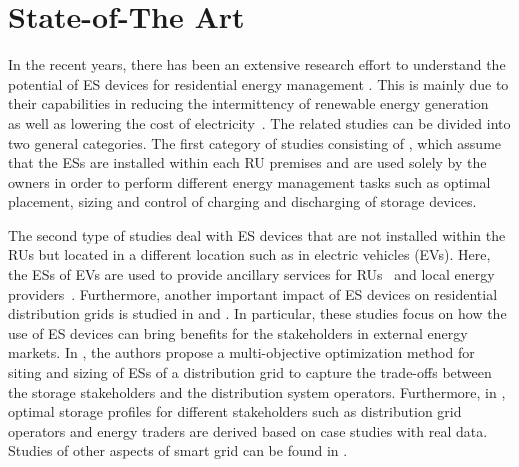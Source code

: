 \documentclass[journal,10pt]{IEEEtran}
\begin{document}
\section{State-of-The Art}\label{sec:literature}
In the recent years, there has been an extensive research effort to understand the potential of ES devices for residential energy management \cite{Siano:2014}. This is mainly due to their capabilities in reducing the intermittency of renewable energy generation~\cite{Denholm:2010} as well as lowering the cost of electricity~\cite{Cao:2004}. The related studies can be divided into two general categories. The first category of studies consisting of \cite{Sechilariu-JTIE:2013,Carpinelli-TSG:2013}, which assume that the ESs are installed within each RU premises and are used solely by the owners in order to perform different energy management tasks such as optimal placement, sizing and control of charging and discharging of storage devices.

The second type of studies deal with ES devices that are not installed within the RUs but located in a different location such as in electric vehicles (EVs). Here, the ESs of EVs are used to provide ancillary services for RUs~\cite{GookKim:2013,VanRoy:2014,RongYu:2014} and local energy providers~\cite{JunhaoLin:2014,JunTan:2014,Igualada:2014}. Furthermore, another important impact of ES devices on residential distribution grids is studied in \cite{Geth-PESGM:2010} and \cite{Nukamp-JTSG:2013}. In particular, these studies focus on how the use of ES devices can bring benefits for the stakeholders in external energy markets. In \cite{Geth-PESGM:2010}, the authors propose a multi-objective optimization method for siting and sizing of ESs of a distribution grid to capture the trade-offs between the storage stakeholders and the distribution system operators. Furthermore, in \cite{Nukamp-JTSG:2013}, optimal storage profiles for different stakeholders such as distribution grid operators and energy traders are derived based on case studies with real data. Studies of other aspects of smart grid can be found in \cite{Tushar-TSG:Dec2015,WT-Li-Access:Nov2015,AqsaNaeem-Access:Nov2015,YLiu-TSG:June2015,Xiumin:Elsevier-July2015,Zhang-ACMN:2015,HengZhang-TCST:2015}.
\end{document}
